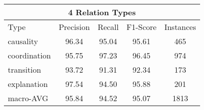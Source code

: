 \begin{table}[ht]
\centering
\begin{tabular}{|l|c|c|c|c|}
\hline

\multicolumn{5}{|c|}{4 Relation Types}                                              \\ \hline
    Type                &     Precision &     Recall &     F1-Score &     Instances \\ \hline
    causality           &     96.34     &     95.04  &     95.61    &     465       \\ \hline
    coordination        &     95.75     &     97.23  &     96.45    &     974       \\ \hline
    transition          &     93.72     &     91.31  &     92.34    &     173       \\ \hline
    explanation         &     97.54     &     94.50  &     95.88    &     201       \\ \hline
    macro-AVG           &     95.84     &     94.52  &     95.07    &     1813      \\ \hline


\end{tabular}
\end{table}

